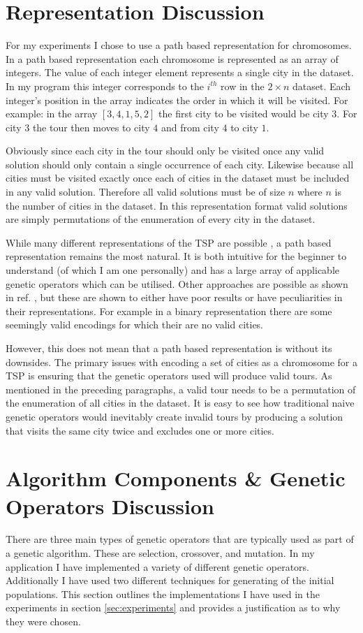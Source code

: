 \documentclass[journal]{IEEEtran}
\begin{document}
\section{Representation Discussion}
For my experiments I chose to use a path based representation for chromosomes. In a path based representation each chromosome is represented as an array of integers. The value of each integer element represents a single city in the dataset. In my program this integer corresponds to the $i^{th}$ row in the $2 \times n$ dataset. Each integer's position in the array indicates the order in which it will be visited. For example: in the array $[3, 4, 1, 5, 2]$ the first city to be visited would be city $3$. For city $3$ the tour then moves to city $4$ and from city $4$ to city $1$. 

Obviously since each city in the tour should only be visited once any valid solution should only contain a single occurrence of each city. Likewise because all cities must be visited exactly once each of cities in the dataset must be included in any valid solution. Therefore all valid solutions must be of size $n$ where $n$ is the number of cities in the dataset. In this representation format valid solutions are simply permutations of the enumeration of every city in the dataset.  

While many different representations of the TSP are possible \cite{larranaga1999genetic}, a path based representation remains the most natural. It is both intuitive for the beginner to understand (of which I am one personally) and has a large array of applicable genetic operators which can be utilised. Other approaches are possible as shown in ref. \cite{larranaga1999genetic}, but these are shown to either have poor results or have peculiarities in their representations. For example in a binary representation there are some seemingly valid encodings for which their are no valid cities.

However, this does not mean that a path based representation is without its downsides. The primary issues with encoding a set of cities as a chromosome for a TSP is ensuring that the genetic operators used will produce valid tours. As mentioned in the preceding paragraphs, a valid tour needs to be a permutation of the enumeration of all cities in the dataset. It is easy to see how traditional naive genetic operators would inevitably create invalid tours by producing a solution that visits the same city twice and excludes one or more cities.

\section{Algorithm Components \& Genetic Operators Discussion}
There are three main types of genetic operators that are typically used as part of a genetic algorithm. These are selection, crossover, and mutation. In my application I have implemented a variety of different genetic operators. Additionally I have used two different techniques for generating  of the initial populations. This section outlines the implementations I have used in the experiments in section \ref{sec:experiments} and provides a justification as to why they were chosen.
\end{document}
